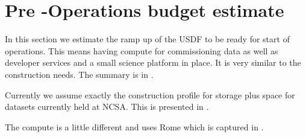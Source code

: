 \section{Pre -Operations budget estimate}\label{sec:opscost}
In this section we estimate the ramp up of the USDF to be ready for start of operations.
This means having compute for commissioning data as well as developer services and a small science platform in place.
It is very similar to the construction needs. The summary is in .



Currently we assume exactly the construction profile for storage plus space for datasets currently held at NCSA.
This is presented in .

The compute is a little different and uses Rome
which is captured in .



